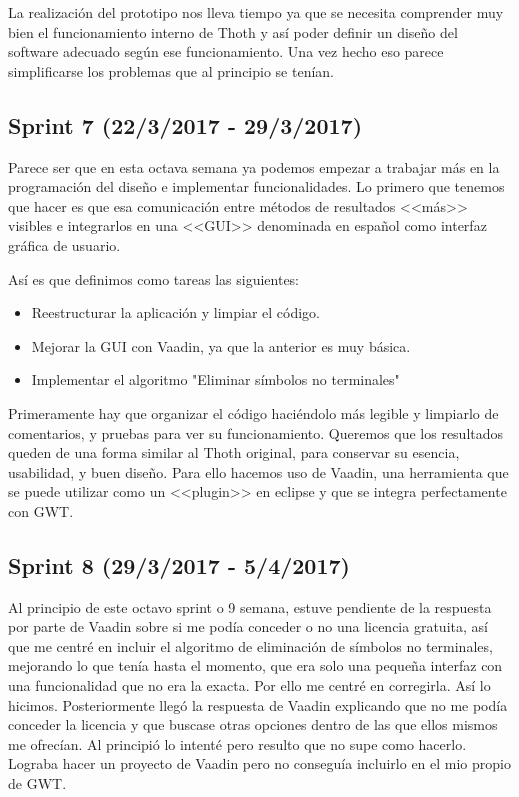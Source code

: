 La realización del prototipo nos lleva tiempo ya que se necesita comprender muy bien el funcionamiento interno de Thoth y así poder definir un diseño del software adecuado según ese funcionamiento. Una vez hecho eso parece simplificarse los problemas que al principio se tenían.

\subsection{Sprint 7 (22/3/2017 - 29/3/2017)}

Parece ser que en esta octava semana ya podemos empezar a trabajar más en la programación del diseño e implementar funcionalidades. Lo primero que tenemos que hacer es que esa comunicación entre métodos de resultados <<más>> visibles e integrarlos en una <<GUI>> denominada en español como interfaz gráfica de usuario. 

Así es que definimos como tareas las siguientes:

\begin{itemize}
\item Reestructurar la aplicación y limpiar el código.
\item Mejorar la GUI con Vaadin, ya que la anterior es muy básica.
\item Implementar el algoritmo "Eliminar símbolos no terminales"
\end{itemize}

Primeramente hay que organizar el código haciéndolo más legible y limpiarlo de comentarios, y pruebas para ver su funcionamiento. Queremos que los resultados queden de una forma similar al Thoth original, para conservar su esencia, usabilidad, y buen diseño. Para ello hacemos uso de Vaadin, una herramienta que se puede utilizar como un <<plugin>> en eclipse y que se integra perfectamente con GWT.

\subsection{Sprint 8 (29/3/2017 - 5/4/2017)}

Al principio de este octavo sprint o 9 semana, estuve pendiente de la respuesta por parte de Vaadin sobre si me podía conceder o no una licencia gratuita, así que me centré en incluir el algoritmo de eliminación de símbolos no terminales, mejorando lo que tenía hasta el momento, que era solo una pequeña interfaz con una funcionalidad que no era la exacta. Por ello me centré en corregirla. Así lo hicimos.
Posteriormente llegó la respuesta de Vaadin explicando que no me podía conceder la licencia y que buscase otras opciones dentro de las que ellos mismos me ofrecían. Al principió lo intenté pero resulto que no supe como hacerlo. Lograba hacer un proyecto de Vaadin pero no conseguía incluirlo en el mio propio de GWT.

